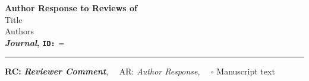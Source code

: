 \providecommand{\lettertitle}{Author Response to Reviews of}
\providecommand{\papertitle}{Title}
\providecommand{\authors}{Authors}
\providecommand{\journal}{Journal}
\providecommand{\doi}{--}





{\Large\bf \lettertitle}\\[1em]
{\huge \papertitle}\\[1em]
{\authors}\\
{\textbf{{\it \journal}, }}{\bfseries\texttt{ID: \doi}}\\
\hrule

\hfill {\bfseries RC:} \textbf{\textit{Reviewer Comment}},\(\quad\) AR: \emph{Author Response}, \(\quad\square\) Manuscript text
